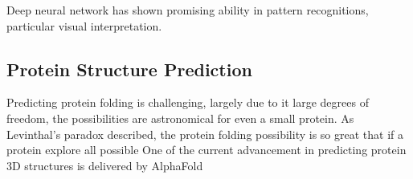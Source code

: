 Deep neural network has shown promising ability in pattern recognitions, particular visual interpretation.
\par 

\subsection{Protein Structure Prediction}
Predicting protein folding is challenging, largely due to it large degrees of freedom, the possibilities are astronomical for even a small protein. As Levinthal's paradox described, the protein folding possibility is so great that if a protein explore all possible  One of the current advancement in predicting protein 3D structures is delivered by AlphaFold